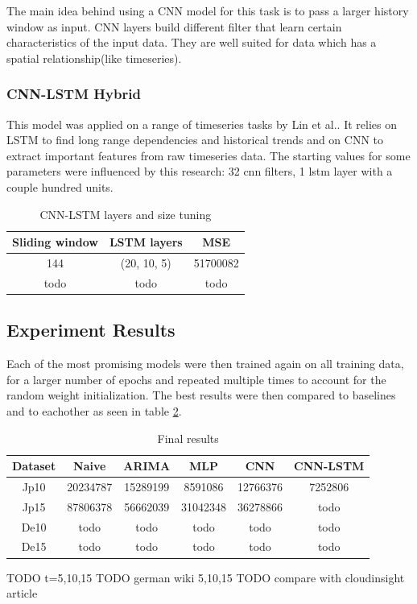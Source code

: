 \documentclass[12pt]{article}
\begin{document}
  The main idea behind using a CNN model for this task is to pass a larger history window as input. 
  CNN layers build different filter that learn certain characteristics of the input data. They are well 
  suited for data which has a spatial relationship(like timeseries)\cite{cnn}.

  \subsubsection{CNN-LSTM Hybrid}
  This model was applied on a range of timeseries tasks by Lin et al.\cite{cnn_lstm}.
  It relies on LSTM to find long range dependencies and historical trends and on CNN 
  to extract important features from raw timeseries data. The starting values for 
  some parameters were influenced by this research: 32 cnn filters, 1 lstm layer with 
  a couple hundred units.

  \begin{table}
    \begin{center}
      \caption{CNN-LSTM layers and size tuning}
      \label{tab:layers_cnn_lstm}
      \begin{tabular}{c|c|c}
        \textbf{Sliding window} & \textbf{LSTM layers} & \textbf{MSE}\\
        \hline
        144 & (20, 10, 5) & 51700082\\
        todo & todo & todo\\
      \end{tabular}
    \end{center}
  \end{table}


  \subsection{Experiment Results}

  Each of the most promising models were then trained again on all training data,
  for a larger number of epochs and repeated multiple times to account for the 
  random weight initialization. The best results were then compared to baselines
  and to eachother as seen in table \ref{tab:final_eval}.

  \begin{table}[h]
    \begin{center}
      \caption{Final results}
      \label{tab:final_eval}
      \begin{tabular}{c|c|c|c|c|c}
        \textbf{Dataset} & \textbf{Naive} & \textbf{ARIMA} & \textbf{MLP} & \textbf{CNN} & \textbf{CNN-LSTM} \\
        \hline
        Jp10 & 20234787 & 15289199 & 8591086 & 12766376 & 7252806 \\
        Jp15 & 87806378 & 56662039 & 31042348 & 36278866 & todo \\
        De10 & todo & todo & todo & todo & todo \\
        De15 & todo & todo & todo & todo & todo \\
      \end{tabular}
    \end{center}
  \end{table}

  TODO t=5,10,15
  TODO german wiki 5,10,15
  TODO compare with cloudinsight article

  \newpage
  {}
  
\end{document}
